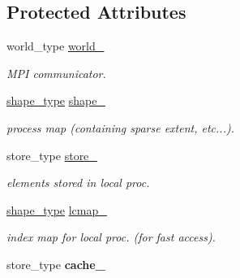 \subsection*{Protected Attributes}
\begin{DoxyCompactItemize}
\item 
\hypertarget{classbtas_1_1_sp_tensor_a0a34dd4422ed278bb2569b7a4e30995e}{
world\_\-type \hyperlink{classbtas_1_1_sp_tensor_a0a34dd4422ed278bb2569b7a4e30995e}{world\_\-}}
\label{classbtas_1_1_sp_tensor_a0a34dd4422ed278bb2569b7a4e30995e}

\begin{DoxyCompactList}\small\item\em MPI communicator. \item\end{DoxyCompactList}\item 
\hypertarget{classbtas_1_1_sp_tensor_a1fd8ecdeff14f2b24ed1410231073217}{
\hyperlink{classbtas_1_1_tensor}{shape\_\-type} \hyperlink{classbtas_1_1_sp_tensor_a1fd8ecdeff14f2b24ed1410231073217}{shape\_\-}}
\label{classbtas_1_1_sp_tensor_a1fd8ecdeff14f2b24ed1410231073217}

\begin{DoxyCompactList}\small\item\em process map (containing sparse extent, etc...). \item\end{DoxyCompactList}\item 
\hypertarget{classbtas_1_1_sp_tensor_a48ccb9d4c7e7dfe0644100c5e0950d18}{
store\_\-type \hyperlink{classbtas_1_1_sp_tensor_a48ccb9d4c7e7dfe0644100c5e0950d18}{store\_\-}}
\label{classbtas_1_1_sp_tensor_a48ccb9d4c7e7dfe0644100c5e0950d18}

\begin{DoxyCompactList}\small\item\em elements stored in local proc. \item\end{DoxyCompactList}\item 
\hypertarget{classbtas_1_1_sp_tensor_a0954b5866817081fccc08b270e123906}{
\hyperlink{classbtas_1_1_tensor}{shape\_\-type} \hyperlink{classbtas_1_1_sp_tensor_a0954b5866817081fccc08b270e123906}{lcmap\_\-}}
\label{classbtas_1_1_sp_tensor_a0954b5866817081fccc08b270e123906}

\begin{DoxyCompactList}\small\item\em index map for local proc. (for fast access). \item\end{DoxyCompactList}\item 
\hypertarget{classbtas_1_1_sp_tensor_ae411bac0ec75070f64e3d21681e68ecc}{
store\_\-type {\bfseries cache\_\-}}
\label{classbtas_1_1_sp_tensor_ae411bac0ec75070f64e3d21681e68ecc}

\end{DoxyCompactItemize}


